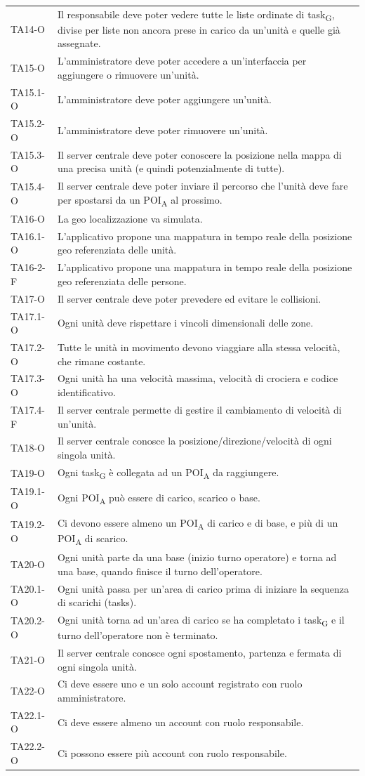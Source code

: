\begin{longtable}{ >{\centering}p{} >{}p{}}
	TA14-O & Il responsabile deve poter vedere tutte le liste ordinate di task\textsubscript{G}, divise per liste non ancora prese in carico da un'unità e quelle già assegnate. \tabularnewline

	TA15-O & L'amministratore deve poter accedere a un'interfaccia per aggiungere o rimuovere un'unità. \tabularnewline
	
	TA15.1-O & L'amministratore deve poter aggiungere un'unità. \tabularnewline

	TA15.2-O & L'amministratore deve poter rimuovere un'unità. \tabularnewline

	TA15.3-O & Il server centrale deve poter conoscere la posizione nella mappa di una precisa unità (e quindi potenzialmente di tutte).\tabularnewline
	TA15.4-O & Il server centrale deve poter inviare il percorso che l'unità deve fare per spostarsi da un POI\textsubscript{A} al prossimo.\tabularnewline

	TA16-O & La geo localizzazione va simulata.\tabularnewline
	TA16.1-O & L'applicativo propone una mappatura in tempo reale della posizione geo referenziata delle unità.\tabularnewline
	TA16-2-F & L'applicativo propone una mappatura in tempo reale della posizione geo referenziata delle persone.\tabularnewline

	TA17-O & Il server centrale deve poter prevedere ed evitare le collisioni.\tabularnewline
	TA17.1-O & Ogni unità deve rispettare i vincoli dimensionali delle zone.\tabularnewline
	TA17.2-O & Tutte le unità in movimento devono viaggiare alla stessa velocità, che rimane costante.\tabularnewline
	TA17.3-O & Ogni unità ha una velocità massima, velocità di crociera e codice identificativo.	\tabularnewline
	TA17.4-F & Il server centrale permette di gestire il cambiamento di velocità di un'unità.\tabularnewline

	TA18-O & Il server centrale conosce la posizione/direzione/velocità di ogni singola unità. \tabularnewline

	TA19-O & Ogni task\textsubscript{G} è collegata ad un POI\textsubscript{A} da raggiungere.\tabularnewline
	TA19.1-O & Ogni POI\textsubscript{A} può essere di carico, scarico o base.\tabularnewline
	TA19.2-O & Ci devono essere almeno un POI\textsubscript{A} di carico e di base, e più di un POI\textsubscript{A} di scarico. \tabularnewline

	TA20-O & Ogni unità parte da una base (inizio turno operatore) e torna ad una base, quando finisce il turno dell'operatore.\tabularnewline
	TA20.1-O & Ogni unità passa per un'area di carico prima di iniziare la sequenza di scarichi (tasks).\tabularnewline
	TA20.2-O & Ogni unità torna ad un'area di carico se ha completato i task\textsubscript{G} e il turno dell'operatore non è terminato.\tabularnewline
	TA21-O & Il server centrale conosce ogni spostamento, partenza e fermata di ogni singola unità.\tabularnewline
	TA22-O & Ci deve essere uno e un solo account registrato con ruolo amministratore.\tabularnewline
	TA22.1-O & Ci deve essere almeno un account con ruolo responsabile.\tabularnewline
	TA22.2-O & Ci possono essere più account con ruolo responsabile.\tabularnewline



\end{longtable}
